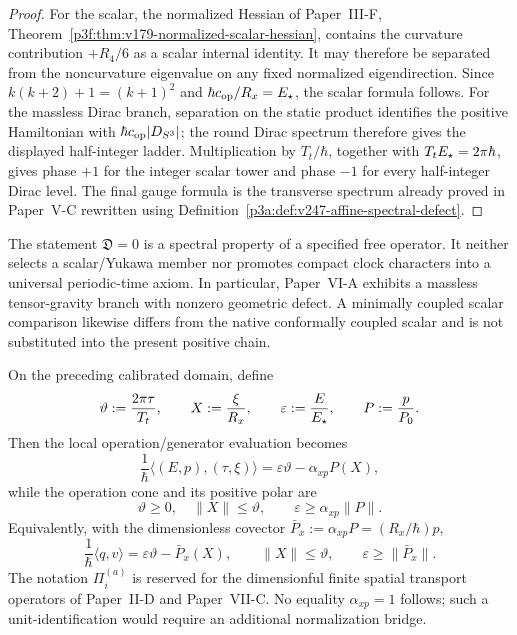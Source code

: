 \documentclass[12pt,a4paper]{article}
\begin{document}
\begin{proof}
For the scalar, the normalized Hessian of
Paper~III-F, Theorem~\ref{p3f:thm:v179-normalized-scalar-hessian}, contains
the curvature contribution \(+R_4/6\) as a scalar internal identity.  It may
therefore be separated from the noncurvature eigenvalue on any fixed
normalized eigendirection.  Since
\(k(k+2)+1=(k+1)^2\) and
\(\hbar c_{\rm op}/R_x=E_\star\), the scalar formula follows.  For the
massless Dirac branch, separation on the static product identifies the
positive Hamiltonian with \(\hbar c_{\rm op}|D_{S^3}|\); the round Dirac
spectrum therefore gives the displayed half-integer ladder.  Multiplication
by \(T_t/\hbar\), together with \(T_tE_\star=2\pi\hbar\), gives phase \(+1\)
for the integer scalar tower and phase \(-1\) for every half-integer Dirac
level.  The final gauge formula is the transverse spectrum already proved in
Paper~V-C rewritten using Definition~\ref{p3a:def:v247-affine-spectral-defect}.
\end{proof}

\begin{remark}
\label{p3a:rem:v247-conformal-matching-scope}
The statement \(\mathfrak D=0\) is a spectral property of a specified free
operator.  It neither selects a scalar/Yukawa member nor promotes compact
clock characters into a universal periodic-time axiom.  In particular,
Paper~VI-A exhibits a massless tensor-gravity branch with nonzero geometric
defect.  A minimally coupled scalar comparison likewise differs from the
native conformally coupled scalar and is not substituted into the present
positive chain.
\end{remark}

\begin{corollary}
\label{p3a:cor:normalized-m8-cone-evaluation}
On the preceding calibrated domain, define
\[
 \vartheta:=\frac{2\pi\tau}{T_t},\qquad X:=\frac{\xi}{R_x},\qquad
 \varepsilon:=\frac{E}{E_\star},\qquad P:=\frac{p}{P_{0}}.
\]
Then the local operation/generator evaluation becomes
\[
 \boxed{\frac1\hbar\langle(E,p),(\tau,\xi)\rangle
 =\varepsilon\vartheta-\alpha_{xp}P(X),}
\]
while the operation cone and its positive polar are
\[
 \boxed{\vartheta\ge0,\quad \|X\|\le\vartheta,\qquad
 \varepsilon\ge\alpha_{xp}\|P\|.}
\]
Equivalently, with the dimensionless covector
\(\bar P_x:=\alpha_{xp}P=(R_x/\hbar)p\),
\[
 \frac1\hbar\langle q,v\rangle=\varepsilon\vartheta-\bar P_x(X),\qquad
 \|X\|\le\vartheta,\qquad \varepsilon\ge\|\bar P_x\|.
\]
The notation $\Pi_i^{(a)}$ is reserved for the dimensionful finite spatial
transport operators of Paper~II-D and Paper~VII-C.
No equality \(\alpha_{xp}=1\) follows; such a unit-identification would require
an additional normalization bridge.
\end{corollary}
\end{document}

